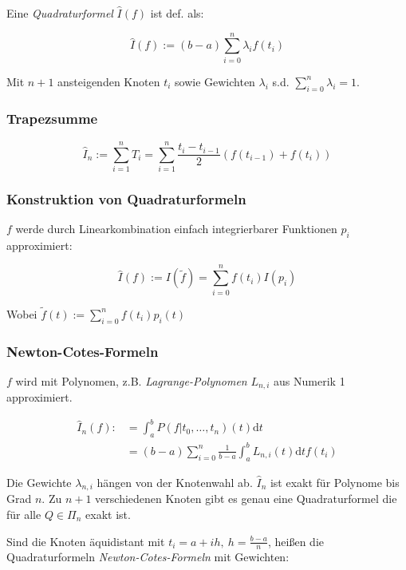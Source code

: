 Eine \emph{Quadraturformel} $\widehat I(f)$ ist def. als:

\vspace*{-2mm}
\[ \widehat I(f) := (b-a)\sum_{i=0}^n \lambda_i f(t_i) \]

Mit $n+1$ ansteigenden Knoten $t_i$ sowie Gewichten $\lambda_i$ s.d. $\sum_{i=0}^n \lambda_i = 1$.

\subsubsection*{Trapezsumme}

\[ \widehat I_n := \sum_{i=1}^n T_i = \sum_{i=1}^n \frac{t_i - t_{i-1}}{2}(f(t_{i-1})+f(t_i)) \]

\subsubsection*{Konstruktion von Quadraturformeln}

$f$ werde durch Linearkombination einfach integrierbarer Funktionen $p_i$ approximiert:

\vspace*{-2mm}
\[ \widehat I(f) := I(\tilde f) = \sum_{i=0}^n f(t_i) I(p_i) \]

Wobei $\tilde f(t) := \sum_{i=0}^n f(t_i) p_i(t)$

\subsubsection*{Newton-Cotes-Formeln}

$f$ wird mit Polynomen, z.B. \emph{Lagrange-Polynomen} $L_{n,i}$ aus Numerik 1 approximiert.

\vspace*{-4mm}
\begin{align*}
\widehat I_n(f) :&= \int_a^b P(f|t_0,\dots,t_n)(t)\text{d}t \\
&= (b-a) \sum_{i=0}^n \frac{1}{b-a} \int_a^b L_{n,i}(t)\text{d}t f(t_i)
\end{align*}

Die Gewichte $\lambda_{n,i}$ hängen von der Knotenwahl ab. $\widehat I_n$ ist exakt für Polynome bis Grad $n$. Zu $n+1$ verschiedenen Knoten gibt es genau eine Quadraturformel die für alle $Q \in \Pi_n$ exakt ist.

\spacing

Sind die Knoten äquidistant mit $t_i = a + ih, \ h=\frac{b-a}{n}$, heißen die Quadraturformeln \emph{Newton-Cotes-Formeln} mit Gewichten:

